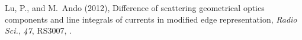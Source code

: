 \documentclass[draft,wrr]{AGUTeX}
\begin{document}
\begin{article}
\begin{thebibliography}{}
Lu, P., and M.~Ando (2012), Difference of scattering geometrical optics
  components and line integrals of currents in modified edge representation,
  \textit{Radio Sci.}, \textit{47},  RS3007, .

\end{thebibliography}





\end{article}

\end{document}
